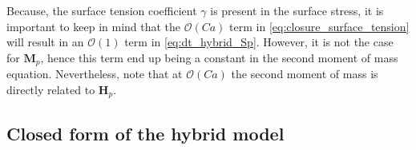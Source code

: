 Because, the surface tension coefficient $\gamma$ is present in the surface stress, it is important to keep in mind that the $\mathcal{O}(Ca)$ term in \ref{eq:closure_surface_tension} will result in an $\mathcal{O}(1)$ term in \ref{eq:dt_hybrid_Sp}. 
However, it is not the case for $\textbf{M}_p$, hence this term end up being a constant in the second moment of mass equation.  
Nevertheless, note that at $\mathcal{O}(Ca)$ the second moment of mass is directly related to $\textbf{H}_p$. 

\subsection{Closed form of the hybrid model}

